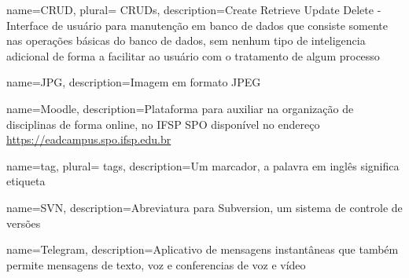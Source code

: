 




 



 {
    name=CRUD,
    plural= {CRUDs},
    description={Create Retrieve Update Delete - Interface de usuário para manutenção em banco de dados que consiste somente nas operações básicas do banco de dados, sem nenhum tipo de inteligencia adicional de forma a facilitar ao usuário com o tratamento de algum processo}
}

 {
    name=JPG,
    description={Imagem em formato JPEG}
}

 {
    name=Moodle,
    description={Plataforma para auxiliar na organização de disciplinas de forma online, no IFSP SPO disponível no endereço \url{https://eadcampus.spo.ifsp.edu.br}}
}


 {
    name=tag,
    plural= {tags},
    description={Um marcador, a palavra em inglês significa etiqueta}
}

 {
    name=SVN,
    description={Abreviatura para Subversion, um sistema de controle de versões}
}
                
 {
    name=Telegram,
    description={Aplicativo de mensagens instantâneas que também permite mensagens de texto, voz e conferencias de voz e vídeo}
}